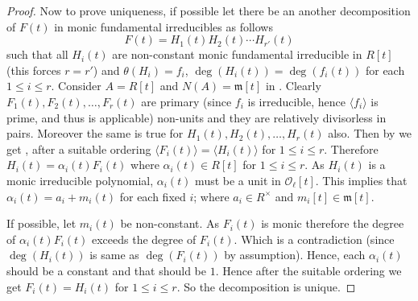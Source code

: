 \documentclass[10pt,a4paper]{amsart}
\begin{document}
\begin{proof}
Now to prove uniqueness, if possible let there be an another decomposition of $F(t)$ in monic fundamental irreducibles as follows $$F(t)= H_1(t)H_2(t)\cdots H_{r'}(t)$$ such that all $H_i(t)$ are non-constant monic fundamental irreducible in $R[t]$ (this forces $r=r'$) and $\theta({H_i})=f_i$, $\deg(H_i(t))=\deg(f_i(t))$ for each $1\leq i\leq r$.
Consider $A=R[t]$ and $N(A)=\mathfrak{m}[t]$ in .
Clearly $F_1(t), F_2(t),\ldots, F_r(t)$ are primary (since $f_i$ is irreducible, hence $\langle f_i\rangle$ is prime, and thus  is applicable) non-units and they are relatively divisorless in pairs.
Moreover the same is true for $H_1(t),H_2(t),\ldots,H_r(t)$ also.
Then by   we get , after a suitable ordering $\langle F_i(t)\rangle=\langle H_i(t)\rangle$ for $1\leq i\leq r$. 
Therefore $H_i(t)=\alpha_i(t)F_i(t)$ where $\alpha_i(t)\in R[t]$ for $1\leq i\leq r$. 
As $H_i(t)$ is a monic irreducible polynomial, $\alpha_i(t)$ must be a unit in $\mathscr O_\ell[t]$.
This implies that $\alpha_i(t)=a_i+m_i(t)$ for each fixed $i$; where $a_i\in R^{\times}$ and $m_i[t]\in \mathfrak{m}[t].$ 

If possible, let $m_i(t)$ be non-constant.
As $F_i(t)$ is monic therefore the degree of $\alpha_i(t)F_i(t)$ exceeds the degree of $F_i(t)$. Which is a contradiction (since $\deg(H_i(t))$ is same as $\deg(F_i(t))$ by assumption). 
Hence, each $\alpha_i(t)$ should be a constant and that should be $1$.
Hence after the suitable ordering we get $F_i(t)=H_i(t)$ for $1\leq i\leq r$. So the decomposition is unique.
\end{proof}
\end{document}
